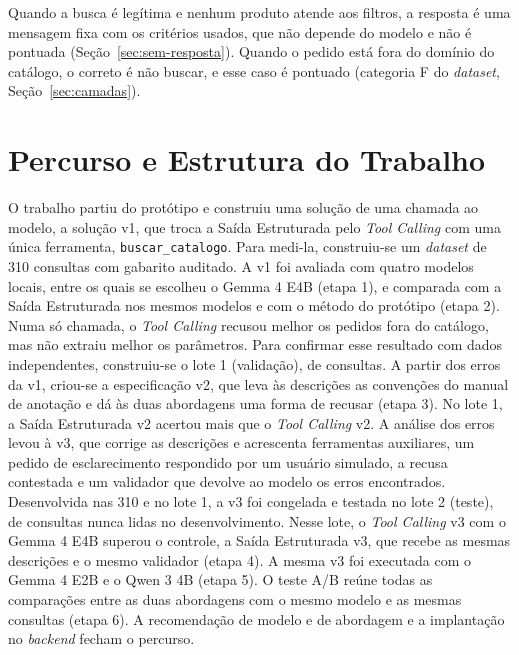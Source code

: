 Quando a busca é legítima e nenhum produto atende aos filtros, a resposta é uma mensagem fixa com os critérios usados, que não depende do modelo e não é pontuada (Seção~\ref{sec:sem-resposta}). Quando o pedido está fora do domínio do catálogo, o correto é não buscar, e esse caso é pontuado (categoria F do \textit{dataset}, Seção~\ref{sec:camadas}).

\section{Percurso e Estrutura do Trabalho}
\label{sec:percurso}

O trabalho partiu do protótipo e construiu uma solução de uma chamada ao modelo, a solução v1, que troca a Saída Estruturada pelo \textit{Tool Calling} com uma única ferramenta, \texttt{buscar\_catalogo}. Para medi-la, construiu-se um \textit{dataset} de 310 consultas com gabarito auditado. A v1 foi avaliada com quatro modelos locais, entre os quais se escolheu o Gemma 4 E4B (etapa 1), e comparada com a Saída Estruturada nos mesmos modelos e com o método do protótipo (etapa 2). Numa só chamada, o \textit{Tool Calling} recusou melhor os pedidos fora do catálogo, mas não extraiu melhor os parâmetros. Para confirmar esse resultado com dados independentes, construiu-se o lote 1 (validação), de  consultas. A partir dos erros da v1, criou-se a especificação v2, que leva às descrições as convenções do manual de anotação e dá às duas abordagens uma forma de recusar (etapa 3). No lote 1, a Saída Estruturada v2 acertou mais que o \textit{Tool Calling} v2. A análise dos erros levou à v3, que corrige as descrições e acrescenta ferramentas auxiliares, um pedido de esclarecimento respondido por um usuário simulado, a recusa contestada e um validador que devolve ao modelo os erros encontrados. Desenvolvida nas 310 e no lote 1, a v3 foi congelada e testada no lote 2 (teste), de  consultas nunca lidas no desenvolvimento. Nesse lote, o \textit{Tool Calling} v3 com o Gemma 4 E4B superou o controle, a Saída Estruturada v3, que recebe as mesmas descrições e o mesmo validador (etapa 4). A mesma v3 foi executada com o Gemma 4 E2B e o Qwen 3 4B (etapa 5). O teste A/B reúne todas as comparações entre as duas abordagens com o mesmo modelo e as mesmas consultas (etapa 6). A recomendação de modelo e de abordagem e a implantação no \textit{backend} fecham o percurso.

